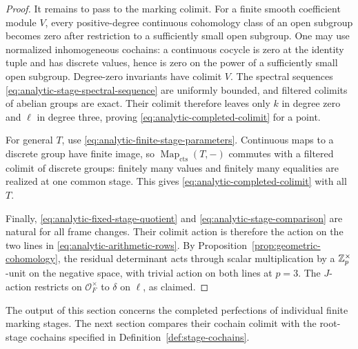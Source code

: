 \begin{proof}
It remains to pass to the marking colimit.
For a finite smooth coefficient module \(V\), every
positive-degree continuous cohomology class of an open subgroup
becomes zero after restriction to a sufficiently small open
subgroup.  One may use normalized inhomogeneous cochains:
a continuous cocycle is zero at the identity tuple and has
discrete values, hence is zero on the power of a sufficiently
small open subgroup.
Degree-zero invariants have colimit \(V\).
The spectral sequences
\eqref{eq:analytic-stage-spectral-sequence} are uniformly bounded,
and filtered colimits of abelian groups are exact.
Their colimit therefore leaves only \(k\) in degree zero and
\(\ell\) in degree three, proving
\eqref{eq:analytic-completed-colimit} for a point.

For general \(T\), use
\eqref{eq:analytic-finite-stage-parameters}.
Continuous maps to a discrete group have finite image, so
\(\operatorname{Map}_{\mathrm{cts}}(T,-)\) commutes with a
filtered colimit of discrete groups: finitely many values and
finitely many equalities are realized at one common stage.
This gives \eqref{eq:analytic-completed-colimit} with all \(T\).

Finally, \eqref{eq:analytic-fixed-stage-quotient} and
\eqref{eq:analytic-stage-comparison} are natural for all frame
changes.  Their colimit action is therefore the action on the two
lines in \eqref{eq:analytic-arithmetic-rows}.
By Proposition~\ref{prop:geometric-cohomology}, the residual
determinant acts through scalar multiplication by a
\(\mathbb Z_p^\times\)-unit on the negative space, with trivial action on
both lines at \(p=3\).  The \(J\)-action restricts on
\(\mathcal O_F^\times\) to \(\delta\) on \(\ell\), as claimed.
\end{proof}

The output of this section concerns the completed perfections of
individual finite marking stages.  The next section compares
their cochain colimit with the root-stage cochains specified in
Definition~\ref{def:stage-cochains}.
